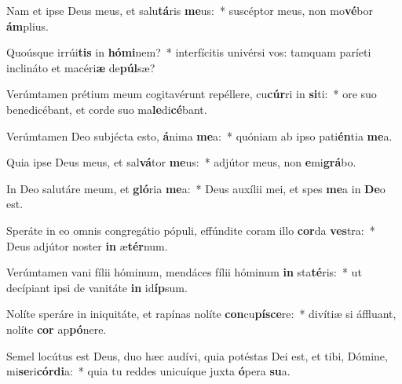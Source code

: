 \item Nam et ipse Deus meus, et salu\textbf{tá}ris \textbf{me}us:~* suscéptor meus, non mo\textbf{vé}bor \textbf{ám}plius.
\item Quoúsque irrúi\textbf{tis} in \textbf{hó}\textbf{mi}nem?~* interfícitis univérsi vos: tamquam paríeti inclináto et macéri\textbf{æ} de\textbf{púl}sæ?
\item Verúmtamen prétium meum cogitavérunt repéllere, cu\textbf{cúr}ri in \textbf{si}ti:~* ore suo benedicébant, et corde suo ma\textbf{le}di\textbf{cé}bant.
\item Verúmtamen Deo subjécta esto, \textbf{á}nima \textbf{me}a:~* quóniam ab ipso pati\textbf{én}tia \textbf{me}a.
\item Quia ipse Deus meus, et sal\textbf{vá}tor \textbf{me}us:~* adjútor meus, non \textbf{e}mi\textbf{grá}bo.
\item In Deo salutáre meum, et \textbf{gló}ria \textbf{me}a:~* Deus auxílii mei, et spes \textbf{me}a in \textbf{De}o est.
\item Speráte in eo omnis congregátio pópuli, effúndite coram illo \textbf{cor}da \textbf{ves}tra:~* Deus adjútor noster \textbf{in} æ\textbf{tér}num.
\item Verúmtamen vani fílii hóminum, mendáces fílii hóminum \textbf{in} sta\textbf{té}ris:~* ut decípiant ipsi de vanitáte \textbf{in} id\textbf{íp}sum.
\item Nolíte speráre in iniquitáte, et rapínas nolíte \textbf{con}cu\textbf{pí}\textbf{sce}re:~* divítiæ si áffluant, nolíte \textbf{cor} ap\textbf{pó}nere.
\item Semel locútus est Deus, duo hæc audívi, quia potéstas Dei est, et tibi, Dómine, mi\textbf{se}ri\textbf{cór}\textbf{di}a:~* quia tu reddes unicuíque juxta \textbf{ó}pera \textbf{su}a.
